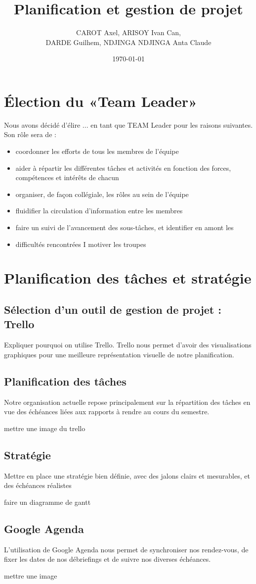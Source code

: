 \documentclass{article}
\title{Planification et gestion de projet}
\author{CAROT Axel, ARISOY Ivan Can, \\ DARDE Guilhem, NDJINGA NDJINGA Anta Claude}
\date{\today}
\begin{document}
\maketitle

\section{Élection du «Team Leader»}
Nous avons décidé d'élire ... en tant que TEAM Leader pour les raisons suivantes. Son rôle sera de :
\begin{itemize}
    \item coordonner les efforts de tous les membres de l’équipe
    \item aider à répartir les différentes tâches et activités en fonction des forces, compétences et intérêts de chacun
    \item organiser, de façon collégiale, les rôles au sein de l’équipe
    \item fluidifier la circulation d’information entre les membres
    \item faire un suivi de l’avancement des sous-tâches, et identifier en amont les
    \item difficultés rencontrées I motiver les troupes
\end{itemize}

\section{Planification des tâches et stratégie}

\subsection{Sélection d'un outil de gestion de projet : Trello}
Expliquer pourquoi on utilise Trello. Trello nous permet d'avoir des visualisations graphiques pour une meilleure représentation visuelle de notre planification. 

\subsection{Planification des tâches}
Notre organisation actuelle repose principalement sur la répartition des tâches en vue des échéances liées aux rapports à rendre au cours du semestre. 

mettre une image du trello

\subsection{Stratégie}
Mettre en place une stratégie bien définie, avec des jalons clairs et mesurables, et des échéances réalistes

faire un diagramme de gantt

\subsection{Google Agenda}
L'utilisation de Google Agenda nous permet de synchroniser nos rendez-vous, de fixer les dates de nos débriefings et de suivre nos diverses échéances. 

mettre une image
\end{document}

